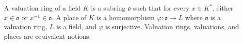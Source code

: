 A valuation ring of a field $K$ is a subring $\mathfrak{o}$ such that for every $x \in K^*$, either $x \in \mathfrak{o}$ or $x^{-1} \in \mathfrak{o}$. A place of $K$ is a homomorphism $\varphi: \mathfrak{o} \to L$ where $\mathfrak{o}$ is a valuation ring, $L$ is a field, and $\varphi$ is surjective. Valuation rings, valuations, and places are equivalent notions.
